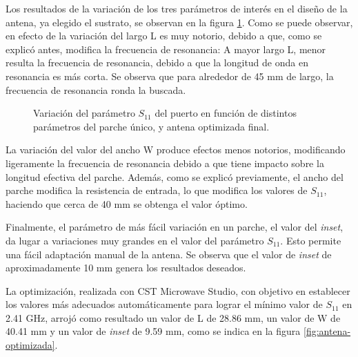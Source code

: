 Los resultados de la variación de los tres parámetros de interés en el diseño de la antena, ya elegido el sustrato, se observan en la figura \ref{fig:simulaciones-microstrip-1parche}. Como se puede observar, en efecto de la variación del largo L es muy notorio, debido a que, como se explicó antes, modifica la frecuencia de resonancia: A mayor largo L, menor resulta la frecuencia de resonancia, debido a que la longitud de onda en resonancia es más corta. Se observa que para alrededor de 45 mm de largo, la frecuencia de resonancia ronda la buscada.

\begin{figure}[H]
	\centering 
	\hspace{19pt}
	\caption{Variación del parámetro $S_{11}$ del puerto en función de distintos parámetros del parche único, y antena optimizada final.}
	\label{fig:simulaciones-microstrip-1parche}
\end{figure}

La variación del valor del ancho W produce efectos menos notorios, modificando ligeramente la frecuencia de resonancia debido a que tiene impacto sobre la longitud efectiva del parche. Además, como se explicó previamente, el ancho del parche modifica la resistencia de entrada, lo que modifica  los valores de $S_{11}$, haciendo que cerca de 40 mm se obtenga el valor óptimo.

Finalmente, el parámetro de más fácil variación en un parche, el valor del \textit{inset}, da lugar a variaciones muy grandes en el valor del parámetro $S_{11}$. Esto permite una fácil adaptación manual de la antena. Se observa que el valor de \textit{inset} de aproximadamente 10 mm genera los resultados deseados.

La optimización, realizada con CST Microwave Studio, con objetivo en establecer los valores más adecuados automáticamente para lograr el mínimo valor de $S_{11}$ en 2.41 GHz, arrojó como resultado un valor de L de 28.86 mm, un valor de W de 40.41 mm y un valor de \textit{inset} de 9.59 mm, como se indica en la figura \ref{fig:antena-optimizada}.

